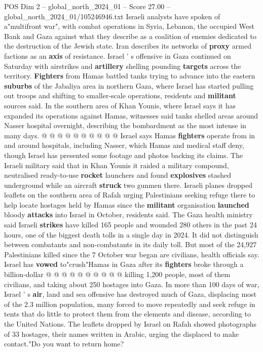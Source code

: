 \begin{textsample}{POS Dim 2 – global\_north\_2024\_01 – Score 27.00 – global\_north\_2024\_01/105246946.txt}
Israeli analysts have spoken of a"multifront war", with combat operations in Syria, Lebanon, the occupied West Bank and Gaza against what they describe as a coalition of enemies dedicated to the destruction of the Jewish state.
Iran describes its networks of \textbf{proxy} armed factions as an \textbf{axis} of resistance.
Israel ' s offensive in Gaza continued on Saturday with airstrikes and \textbf{artillery} shelling pounding \textbf{targets} across the territory. \textbf{Fighters} from Hamas battled tanks trying to advance into the eastern \textbf{suburbs} of the Jabaliya area in northern Gaza, where Israel has started pulling out troops and shifting to smaller-scale operations, residents and \textbf{militant} sources said.
In the southern area of Khan Younis, where Israel says it has expanded its operations against Hamas, witnesses said tanks shelled areas around Nasser hospital overnight, describing the bombardment as the most intense in many days. @ @ @ @ @ @ @ @ @ @ Israel says Hamas \textbf{fighters} operate from in and around hospitals, including Nasser, which Hamas and medical staff deny, though Israel has presented some footage and photos backing its claims.
The Israeli military said that in Khan Younis it raided a military compound, neutralised ready-to-use \textbf{rocket} launchers and found \textbf{explosives} stashed underground while an aircraft \textbf{struck} two gunmen there.
Israeli planes dropped leaflets on the southern area of Rafah urging Palestinians seeking refuge there to help locate hostages held by Hamas since the \textbf{militant} organisation \textbf{launched} bloody \textbf{attacks} into Israel in October, residents said.
The Gaza health ministry said Israeli \textbf{strikes} have killed 165 people and wounded 280 others in the past 24 hours, one of the biggest death tolls in a single day in 2024.
It did not distinguish between combatants and non-combatants in its daily toll.
But most of the 24,927 Palestinians killed since the 7 October war began are civilians, health officials say.
Israel has \textbf{vowed} to"crush"Hamas in Gaza after its \textbf{fighters} broke through a billion-dollar @ @ @ @ @ @ @ @ @ @ killing 1,200 people, most of them civilians, and taking about 250 hostages into Gaza.
In more than 100 days of war, Israel ' s \textbf{air}, land and sea offensive has destroyed much of Gaza, displacing most of the 2.3 million population, many forced to move repeatedly and seek refuge in tents that do little to protect them from the elements and disease, according to the United Nations.
The leaflets dropped by Israel on Rafah showed photographs of 33 hostages, their names written in Arabic, urging the displaced to make contact."Do you want to return home?

\end{textsample}
